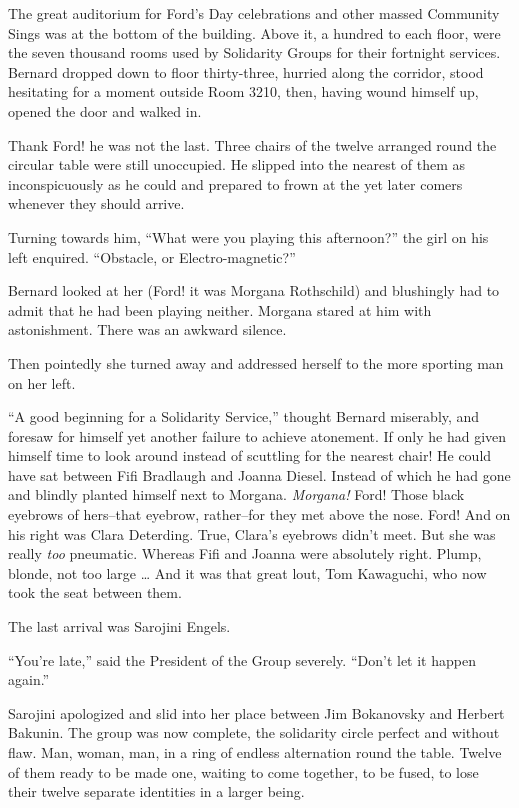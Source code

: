\documentclass[12pt]{report}
\begin{document}
The great auditorium for Ford's Day celebrations and other massed
Community Sings was at the bottom of the building. Above it, a hundred
to each floor, were the seven thousand rooms used by Solidarity Groups
for their fortnight services. Bernard dropped down to floor
thirty-three, hurried along the corridor, stood hesitating for a moment
outside Room 3210, then, having wound himself up, opened the door and
walked in.

Thank Ford! he was not the last. Three chairs of the twelve arranged
round the circular table were still unoccupied. He slipped into the
nearest of them as inconspicuously as he could and prepared to frown at
the yet later comers whenever they should arrive.

Turning towards him, ``What were you playing this afternoon?'' the girl
on his left enquired. ``Obstacle, or Electro-magnetic?''

Bernard looked at her (Ford! it was Morgana Rothschild) and blushingly
had to admit that he had been playing neither. Morgana stared at him
with astonishment. There was an awkward silence.

Then pointedly she turned away and addressed herself to the more
sporting man on her left.

``A good beginning for a Solidarity Service,'' thought Bernard
miserably, and foresaw for himself yet another failure to achieve
atonement. If only he had given himself time to look around instead of
scuttling for the nearest chair! He could have sat between Fifi
Bradlaugh and Joanna Diesel. Instead of which he had gone and blindly
planted himself next to Morgana. \emph{Morgana!} Ford! Those black
eyebrows of hers--that eyebrow, rather--for they met above the nose.
Ford! And on his right was Clara Deterding. True, Clara's eyebrows
didn't meet. But she was really \emph{too} pneumatic. Whereas Fifi and
Joanna were absolutely right. Plump, blonde, not too large \ldots{} And
it was that great lout, Tom Kawaguchi, who now took the seat between
them.

The last arrival was Sarojini Engels.

``You're late,'' said the President of the Group severely. ``Don't let
it happen again.''

Sarojini apologized and slid into her place between Jim Bokanovsky and
Herbert Bakunin. The group was now complete, the solidarity circle
perfect and without flaw. Man, woman, man, in a ring of endless
alternation round the table. Twelve of them ready to be made one,
waiting to come together, to be fused, to lose their twelve separate
identities in a larger being.
\end{document}
